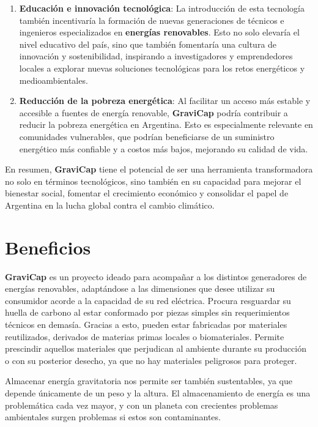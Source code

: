 \begin{enumerate}
                    \item \textbf{Educación e innovación tecnológica}: La introducción de esta tecnología también incentivaría la formación de nuevas generaciones de técnicos e ingenieros especializados en \textbf{energías renovables}. Esto no solo elevaría el nivel educativo del país, sino que también fomentaría una cultura de innovación y sostenibilidad, inspirando a investigadores y emprendedores locales a explorar nuevas soluciones tecnológicas para los retos energéticos y medioambientales.\par
                    \item \textbf{Reducción de la pobreza energética}: Al facilitar un acceso más estable y accesible a fuentes de energía renovable, \textcolor{dark_violet}{\textbf{GraviCap}} podría contribuir a reducir la pobreza energética en Argentina. Esto es especialmente relevante en comunidades vulnerables, que podrían beneficiarse de un suministro energético más confiable y a costos más bajos, mejorando su calidad de vida.
                \end{enumerate}
                En resumen, \textcolor{dark_violet}{\textbf{GraviCap}} tiene el potencial de ser una herramienta transformadora no solo en términos tecnológicos, sino también en su capacidad para mejorar el bienestar social, fomentar el crecimiento económico y consolidar el papel de Argentina en la lucha global contra el cambio climático.\par
        
        \section{Beneficios}
            \textcolor{dark_violet}{\textbf{GraviCap}} es un proyecto ideado para acompañar a los distintos generadores de energías renovables, adaptándose a las dimensiones que desee utilizar su consumidor acorde a la capacidad de su red eléctrica. Procura resguardar su huella de carbono al estar conformado por piezas simples sin requerimientos técnicos en demasía. Gracias a esto, pueden estar fabricadas por materiales reutilizados, derivados de materias primas locales o biomateriales. Permite prescindir aquellos materiales que perjudican al ambiente durante su producción o con su posterior desecho, ya que no hay materiales peligrosos para proteger.\par
            Almacenar energía gravitatoria nos permite ser también sustentables, ya que depende únicamente de un peso y la altura. El almacenamiento de energía es una problemática cada vez mayor, y con un planeta con crecientes problemas ambientales surgen problemas si estos son contaminantes.\par
            
